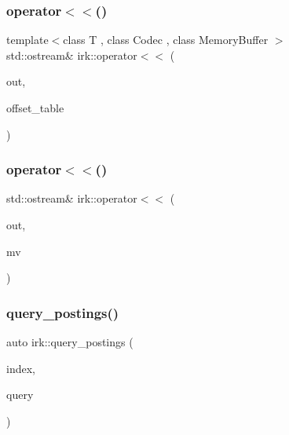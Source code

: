 \subsubsection{\texorpdfstring{operator$<$$<$()}{operator<<()}\hspace{0.1cm}{\footnotesize\ttfamily [2/3]}}
{\footnotesize\ttfamily template$<$class T , class Codec , class Memory\+Buffer $>$ \\
std\+::ostream\& irk\+::operator$<$$<$ (\begin{DoxyParamCaption}\item[{std\+::ostream \&}]{out,  }\item[{const \mbox{\hyperlink{classirk_1_1compact__table}{compact\+\_\+table}}$<$ T, Codec, Memory\+Buffer $>$ \&}]{offset\+\_\+table }\end{DoxyParamCaption})}

\mbox{\label{namespaceirk_af318ecad298eb6ae661381e646c04e80}} 
\subsubsection{\texorpdfstring{operator$<$$<$()}{operator<<()}\hspace{0.1cm}{\footnotesize\ttfamily [3/3]}}
{\footnotesize\ttfamily std\+::ostream\& irk\+::operator$<$$<$ (\begin{DoxyParamCaption}\item[{std\+::ostream \&}]{out,  }\item[{const \mbox{\hyperlink{classirk_1_1memory__view}{memory\+\_\+view}} \&}]{mv }\end{DoxyParamCaption})\hspace{0.3cm}{\ttfamily [inline]}}

\mbox{\label{namespaceirk_af66b19416653b16808a23d66c715635a}} 
\subsubsection{\texorpdfstring{query\+\_\+postings()}{query\_postings()}}
{\footnotesize\ttfamily auto irk\+::query\+\_\+postings (\begin{DoxyParamCaption}\item[{const \mbox{\hyperlink{namespaceirk_a137711df98ba695c3526ba4004853a47}{irk\+::inverted\+\_\+index\+\_\+view}} \&}]{index,  }\item[{const std\+::vector$<$ std\+::string $>$ \&}]{query }\end{DoxyParamCaption})\hspace{0.3cm}{\ttfamily [inline]}}

